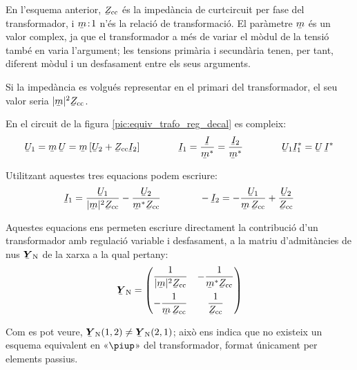 En l'esquema anterior, $\cmplx{Z}\ped{cc}$ és la impedància de curtcircuit per fase del transformador, i $\cmplx{m}\!:\!1$ n'és la
relació de transformació. El paràmetre $\cmplx{m}$ és un valor
complex, ja que el transformador a més de variar el mòdul de la
tensió també en varia  l'argument; les tensions primària i
secundària tenen, per tant,  diferent mòdul i un desfasament entre els
seus arguments.

Si la impedància es volgués representar en el primari del
transformador, el seu valor seria $|\cmplx{m}|^2 \cmplx{Z}\ped{cc}$.

En el circuit de la figura \vref{pic:equiv_trafo_reg_decal} es
compleix: 
\begin{equation}
   \cmplx{U}_1 = \cmplx{m} \,\cmplx{U} = \cmplx{m}\,
   [\cmplx{U}_2+\cmplx{Z}\ped{cc}\cmplx{I}_2]
   \qquad\qquad
   \cmplx{I}_1 = \frac{\cmplx{I}}{\cmplx{m}^*} = \frac{\cmplx{I}_2}{\cmplx{m}^*}
   \qquad\qquad
   \cmplx{U}_1 \cmplx{I}_1^* = \cmplx{U} \,\cmplx{I}^*
\end{equation}

Utilitzant aquestes tres equacions podem escriure:
\begin{equation}
   \cmplx{I}_1 = \frac{\cmplx{U}_1}{|\cmplx{m}|^2 \cmplx{Z}\ped{cc}} - \frac{\cmplx{U}_2}
   {\cmplx{m}^* \cmplx{Z}\ped{cc}} \qquad\qquad
   - \cmplx{I}_2 = - \frac{\cmplx{U}_1}{\cmplx{m} \,\cmplx{Z}\ped{cc}} + \frac{\cmplx{U}_2}
   {\cmplx{Z}\ped{cc}}
\end{equation}

Aquestes equacions ens permeten escriure directament la
contribució d'un transformador amb regulació variable i desfasament, a
la matriu d'admitàncies de nus $\mcmplx{Y}\ped{N}$ de la xarxa a la
qual pertany: 
\begin{equation} \label{eq:yn_trafo_reg_decal}
   \mcmplx{Y}\ped{N} = \begin{pmatrix}
     \dfrac{1}{|\cmplx{m}|^2 \cmplx{Z}\ped{cc}} & - \dfrac{1}
   {\cmplx{m}^* \cmplx{Z}\ped{cc}} \\[2.5ex]
     - \dfrac{1}{\cmplx{m} \,\cmplx{Z}\ped{cc}} & \dfrac{1}
   {\cmplx{Z}\ped{cc}}
   \end{pmatrix}
\end{equation}

Com es pot veure, $\mcmplx{Y}\ped{N}(1,2) \neq
\mcmplx{Y}\ped{N}(2,1)$; això ens indica que no existeix un esquema
equivalent en «$\piup$» del transformador, format únicament per
elements passius.

